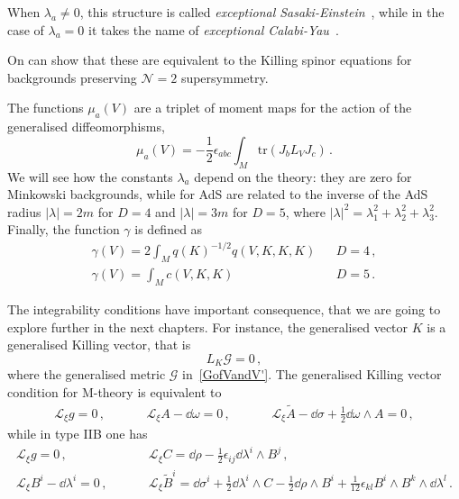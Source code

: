\documentclass[debug]{phd}
\begin{document}
					When $\lambda_a \neq 0$, this structure is called \emph{exceptional Sasaki-Einstein}~\cite{AshmoreESE}, while in the case of $\lambda_a = 0$ it takes the name of \emph{exceptional Calabi-Yau}~\cite{AshmoreECY}.
					
					On can show that these are equivalent to the Killing spinor equations for backgrounds preserving $\mathcal{N}=2$ supersymmetry.
	
					The functions $\mu_{a} (V)$ are a triplet of moment maps for the action of the generalised diffeomorphisms,
							\begin{equation}
								\mu_a(V) = - \frac{1}{2} \epsilon_{abc} \int_M \mathrm{tr}(J_b L_V J_c)\, .
							\end{equation}	
					We will see how the constants $\lambda_a$ depend on the theory: they are zero for Minkowski backgrounds, while for AdS are related to the inverse of the AdS radius $\lvert \lambda\rvert=2m$ for $D=4$ and $\lvert \lambda\rvert=3m$ for $D=5$, where $\lvert \lambda\rvert^2=\lambda_1^2+\lambda_2^2+\lambda_3^2$. 
					Finally, the function $\gamma$ is defined as
							\begin{equation}
								\begin{array}{llc}
									\gamma (V) = 2 \int_M q(K)^{-1/2} q(V,K,K,K) &{}& D=4\, , \\[1mm]
									\gamma (V) =\int_M c(V,K,K) & {}& D=5 \, .
								\end{array}
							\end{equation}
					
					The integrability conditions have important consequence, that we are going to explore further in the next chapters. 
					For instance, the generalised vector $K$ is a generalised Killing vector, that is
							\begin{equation}
								L_K \mathcal{G} = 0	\, ,
							\end{equation}
					where the generalised metric $\mathcal{G}$ in~\eqref{GofVandV'}. 
					The generalised Killing vector condition for M-theory is equivalent to
							\begin{equation}
								\begin{array}{ccccc}
									\mathcal{L}_\xi g = 0\, , &\phantom{and}& \mathcal{L}_\xi A - \dd \omega = 0\, , &\phantom{and}& \mathcal{L}_\xi \tilde{A} -\dd \sigma + \tfrac{1}{2} \dd \omega \wedge A = 0\, ,
								\end{array}
							\end{equation}
					while in type IIB one has
							\begin{equation}
								\begin{array}{lcl}
									\mathcal{L}_\xi g = 0\, , &\phantom{and}& \mathcal{L}_\xi C = \dd \rho - \tfrac{1}{2}\epsilon_{ij}\dd \lambda^i \wedge B^j \, , \\[1mm] 
									\mathcal{L}_\xi B^i - \dd \lambda^i = 0\, , &\phantom{and}& \mathcal{L}_\xi \tilde{B}^i = \dd \sigma^i + \tfrac{1}{2} \dd \lambda^i \wedge C - \tfrac{1}{2} \dd \rho \wedge B^i + \tfrac{1}{12}\epsilon_{kl} B^i \wedge B^k \wedge \dd \lambda^l \, .
								\end{array}
							\end{equation}
\end{document}
